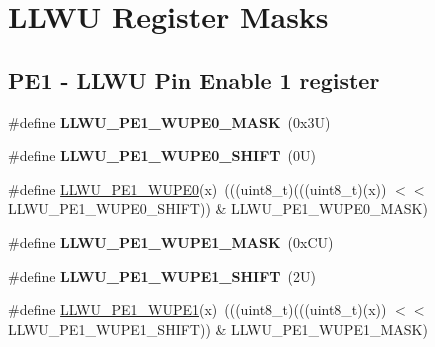 \hypertarget{group___l_l_w_u___register___masks}{}\section{L\+L\+WU Register Masks}
\label{group___l_l_w_u___register___masks}
\subsection*{P\+E1 -\/ L\+L\+WU Pin Enable 1 register}
\begin{DoxyCompactItemize}
\item 
\mbox{\label{group___l_l_w_u___register___masks_ga6ed6c56a8797caa64d27eb915c164dad}} 
\#define {\bfseries L\+L\+W\+U\+\_\+\+P\+E1\+\_\+\+W\+U\+P\+E0\+\_\+\+M\+A\+SK}~(0x3\+U)
\item 
\mbox{\label{group___l_l_w_u___register___masks_ga234c02ee9c2b3e3e248c90473e922336}} 
\#define {\bfseries L\+L\+W\+U\+\_\+\+P\+E1\+\_\+\+W\+U\+P\+E0\+\_\+\+S\+H\+I\+FT}~(0\+U)
\item 
\#define \mbox{\hyperlink{group___l_l_w_u___register___masks_ga61f1d3c27404e82bdebb9627e83f35dd}{L\+L\+W\+U\+\_\+\+P\+E1\+\_\+\+W\+U\+P\+E0}}(x)~(((uint8\+\_\+t)(((uint8\+\_\+t)(x)) $<$$<$ L\+L\+W\+U\+\_\+\+P\+E1\+\_\+\+W\+U\+P\+E0\+\_\+\+S\+H\+I\+FT)) \& L\+L\+W\+U\+\_\+\+P\+E1\+\_\+\+W\+U\+P\+E0\+\_\+\+M\+A\+SK)
\item 
\mbox{\label{group___l_l_w_u___register___masks_gac0c417f78992f2ebaca7267ef06d888a}} 
\#define {\bfseries L\+L\+W\+U\+\_\+\+P\+E1\+\_\+\+W\+U\+P\+E1\+\_\+\+M\+A\+SK}~(0x\+C\+U)
\item 
\mbox{\label{group___l_l_w_u___register___masks_gaa9b8224f389f9c3d4f13772d8e5fbeee}} 
\#define {\bfseries L\+L\+W\+U\+\_\+\+P\+E1\+\_\+\+W\+U\+P\+E1\+\_\+\+S\+H\+I\+FT}~(2\+U)
\item 
\#define \mbox{\hyperlink{group___l_l_w_u___register___masks_gab35a751adac37592806af18a4f6e3837}{L\+L\+W\+U\+\_\+\+P\+E1\+\_\+\+W\+U\+P\+E1}}(x)~(((uint8\+\_\+t)(((uint8\+\_\+t)(x)) $<$$<$ L\+L\+W\+U\+\_\+\+P\+E1\+\_\+\+W\+U\+P\+E1\+\_\+\+S\+H\+I\+FT)) \& L\+L\+W\+U\+\_\+\+P\+E1\+\_\+\+W\+U\+P\+E1\+\_\+\+M\+A\+SK)
\item 

\end{DoxyCompactItemize}
